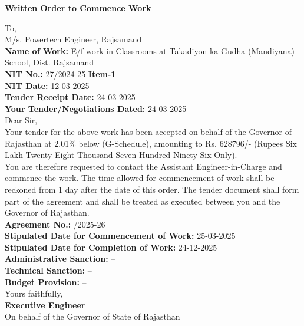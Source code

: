 \documentclass[a4paper]{article}
\begin{document}
\begin{center}
    \textbf{\Large Written Order to Commence Work}
\end{center}

To, \\
M/s. Powertech Engineer, Rajsamand \\

\vspace{0.5cm}
\textbf{Name of Work:} E/f work in Classrooms at Takadiyon ka Gudha (Mandiyana) School, Dist. Rajsamand \\
\textbf{NIT No.:} 27/2024-25 \quad \textbf{Item-1} \\
\textbf{NIT Date:} 12-03-2025 \\
\textbf{Tender Receipt Date:} 24-03-2025 \\
\textbf{Your Tender/Negotiations Dated:} 24-03-2025 \\

Dear Sir, \\

Your tender for the above work has been accepted on behalf of the Governor of Rajasthan at 2.01\% below (G-Schedule), amounting to Rs. 628796/- (Rupees Six Lakh Twenty Eight Thousand Seven Hundred Ninety Six Only). \\

You are therefore requested to contact the Assistant Engineer-in-Charge and commence the work. The time allowed for commencement of work shall be reckoned from 1 day after the date of this order. The tender document shall form part of the agreement and shall be treated as executed between you and the Governor of Rajasthan. \\

\textbf{Agreement No.:} /2025-26 \\
\textbf{Stipulated Date for Commencement of Work:} 25-03-2025 \\
\textbf{Stipulated Date for Completion of Work:} 24-12-2025 \\
\textbf{Administrative Sanction:} -- \\
\textbf{Technical Sanction:} -- \\
\textbf{Budget Provision:} -- \\

Yours faithfully, \\
\vspace{0.5cm}
\textbf{Executive Engineer} \\
On behalf of the Governor of State of Rajasthan \\
\end{document}
